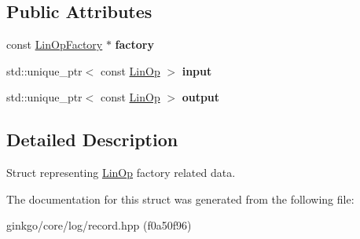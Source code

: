 \subsection*{Public Attributes}
\begin{DoxyCompactItemize}
\item 
\mbox{\label{structgko_1_1log_1_1linop__factory__data_abd892acbefd3c147e384a3dcc897f6ac}} 
const \hyperlink{classgko_1_1LinOpFactory}{Lin\+Op\+Factory} $\ast$ {\bfseries factory}
\item 
\mbox{\label{structgko_1_1log_1_1linop__factory__data_a6ea6595461c7157fa729c91239147f14}} 
std\+::unique\+\_\+ptr$<$ const \hyperlink{classgko_1_1LinOp}{Lin\+Op} $>$ {\bfseries input}
\item 
\mbox{\label{structgko_1_1log_1_1linop__factory__data_a5056dcdd50e3f842c2069959ca85b1c3}} 
std\+::unique\+\_\+ptr$<$ const \hyperlink{classgko_1_1LinOp}{Lin\+Op} $>$ {\bfseries output}
\end{DoxyCompactItemize}


\subsection{Detailed Description}
Struct representing \hyperlink{classgko_1_1LinOp}{Lin\+Op} factory related data. 

The documentation for this struct was generated from the following file\+:\begin{DoxyCompactItemize}
\item 
ginkgo/core/log/record.\+hpp (f0a50f96)\end{DoxyCompactItemize}
